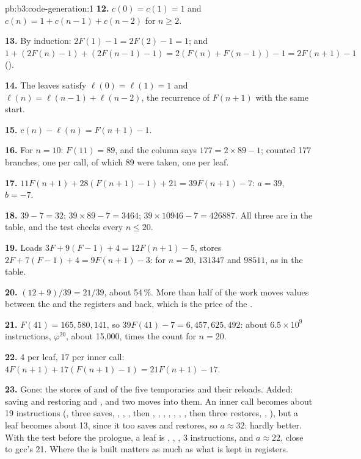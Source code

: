 \begin{solution}{pb:b3:code-generation:1}
\textbf{12.} $c(0) = c(1) = 1$ and $c(n) = 1 + c(n-1) + c(n-2)$ for $n \ge 2$.

\textbf{13.} By induction: $2F(1) - 1 = 2F(2) - 1 = 1$; and $1 + (2F(n) - 1) + (2F(n-1) - 1) = 2(F(n) + F(n-1)) - 1 = 2F(n+1) - 1$ ().

\textbf{14.} The leaves satisfy $\ell(0) = \ell(1) = 1$ and $\ell(n) = \ell(n-1) + \ell(n-2)$, the recurrence of $F(n+1)$ with the same start.

\textbf{15.} $c(n) - \ell(n) = F(n+1) - 1$.

\textbf{16.} For $n = 10$: $F(11) = 89$, and the column says $177 = 2 \times 89 - 1$;  counted 177 branches, one per call, of which 89 were taken, one per leaf.

\textbf{17.} $11F(n+1) + 28(F(n+1) - 1) + 21 = 39F(n+1) - 7$: $a = 39$, $b = -7$.

\textbf{18.} $39 - 7 = 32$; $39 \times 89 - 7 = 3464$; $39 \times 10946 - 7 = 426887$. All three are in the table, and the test  checks every $n \le 20$.

\textbf{19.} Loads $3F + 9(F - 1) + 4 = 12F(n+1) - 5$, stores $2F + 7(F - 1) + 4 = 9F(n+1) - 3$: for $n = 20$, $131347$ and $98511$, as in the table.

\textbf{20.} $(12 + 9)/39 = 21/39$, about 54\,\%. More than half of the work moves values between the  and the registers and back, which is the price of the .

\textbf{21.} $F(41) = 165{,}580{,}141$, so $39 F(41) - 7 = 6{,}457{,}625{,}492$: about $6.5 \times 10^9$ instructions, $\varphi^{20}$, about 15{,}000, times the count for $n = 20$.

\textbf{22.} 4 per leaf, 17 per inner call: $4F(n+1) + 17(F(n+1) - 1) = 21F(n+1) - 17$.

\textbf{23.} Gone: the stores of  and of the five temporaries and their reloads. Added: saving and restoring  and , and two moves into them. An inner call becomes about 19 instructions (, three saves, , , , then , , , , , , , then three restores, , ), but a leaf becomes about 13, since it too saves and restores, so $a \approx 32$: hardly better. With the test before the prologue, a leaf is , , , 3 instructions, and $a \approx 22$, close to gcc's 21. Where the  is built matters as much as what is kept in registers.


\end{solution}
